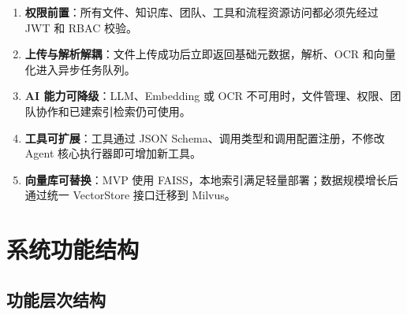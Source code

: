 \documentclass[a4paper,zihao=-4]{ctexart}
\providecommand{\tightlist}{%
  \setlength{\itemsep}{0pt}\setlength{\parskip}{0pt}}
\begin{document}
\begin{enumerate}
\def\labelenumi{\arabic{enumi}.}
\tightlist
\item
  \textbf{权限前置}：所有文件、知识库、团队、工具和流程资源访问都必须先经过
  JWT 和 RBAC 校验。
\item
  \textbf{上传与解析解耦}：文件上传成功后立即返回基础元数据，解析、OCR
  和向量化进入异步任务队列。
\item
  \textbf{AI 能力可降级}：LLM、Embedding 或 OCR
  不可用时，文件管理、权限、团队协作和已建索引检索仍可使用。
\item
  \textbf{工具可扩展}：工具通过 JSON
  Schema、调用类型和调用配置注册，不修改 Agent
  核心执行器即可增加新工具。
\item
  \textbf{向量库可替换}：MVP 使用
  FAISS，本地索引满足轻量部署；数据规模增长后通过统一 VectorStore
  接口迁移到 Milvus。
\end{enumerate}

\hypertarget{ux7cfbux7edfux529fux80fdux7ed3ux6784}{%
\section{系统功能结构}\label{ux7cfbux7edfux529fux80fdux7ed3ux6784}}

\hypertarget{ux529fux80fdux5c42ux6b21ux7ed3ux6784}{%
\subsection{功能层次结构}\label{ux529fux80fdux5c42ux6b21ux7ed3ux6784}}
\end{document}
